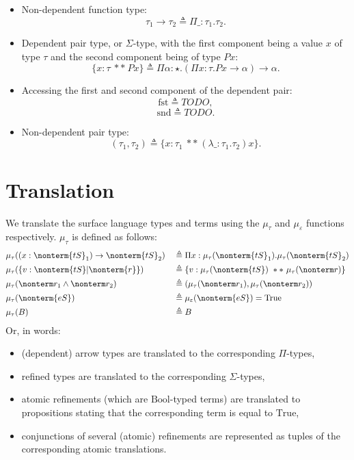 \documentclass[a4paper]{article}
\begin{document}
\begin{itemize}
  \item Non-dependent function type:
  \[
    \tau_1 \rightarrow \tau_2 \triangleq \Pi \_ : \tau_1. \tau_2.
  \]
  \item Dependent pair type, or $\Sigma$-type, with the first component being a value $x$ of type $\tau$ and the second component being of type $P x$:
  \[
    \{ x : \tau\ **\ P x \} \triangleq \Pi \alpha : \star. (\Pi x : \tau. P x \rightarrow \alpha) \rightarrow \alpha.
  \]
  \item Accessing the first and second component of the dependent pair:
  \[
    \text{fst} \triangleq TODO,
  \]
  \[
    \text{snd} \triangleq TODO.
  \]
  \item Non-dependent pair type:
  \[
    (\tau_1, \tau_2) \triangleq \{ x : \tau_1\ **\ (\lambda \_ : \tau_1. \tau_2) x \}.
  \]
\end{itemize}

\section{Translation}

We translate the surface language types and terms using the $\mu_\tau$ and $\mu_\varepsilon$ functions respectively.
$\mu_\tau$ is defined as follows:
\begin{equation}
\begin{aligned}
  & \mu_\tau( (x : \nonterm{tS}_1) \rightarrow \nonterm{tS}_2)  && \triangleq \Pi x : \mu_\tau(\nonterm{tS}_1). \mu_\tau(\nonterm{tS}_2)  \\
  & \mu_\tau( \{ v : \nonterm{tS} | \nonterm{r} \})             && \triangleq \{ v : \mu_\tau(\nonterm{tS})\ **\ \mu_\tau(\nonterm r) \}  \\
  & \mu_\tau( \nonterm r_1 \land \nonterm r_2 )                 && \triangleq ( \mu_\tau(\nonterm r_1) , \mu_\tau(\nonterm r_2))          \\
  & \mu_\tau( \nonterm{eS} )                                    && \triangleq \mu_\varepsilon(\nonterm{eS}) = \text{True}                 \\
  & \mu_\tau(B)                                                 && \triangleq B                                                           \\
\end{aligned}
\end{equation}
Or, in words:
\begin{itemize}
  \item (dependent) arrow types are translated to the corresponding $\Pi$-types,
  \item refined types are translated to the corresponding $\Sigma$-types,
  \item atomic refinements (which are $\text{Bool}$-typed terms) are translated to propositions stating that the corresponding term is equal to $\text{True}$,
  \item conjunctions of several (atomic) refinements are represented as tuples of the corresponding atomic translations.
\end{itemize}
\end{document}
